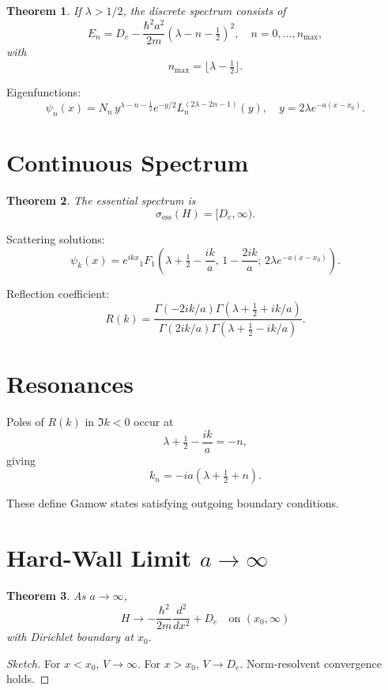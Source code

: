\documentclass[12pt]{article}
\newtheorem{theorem}{Theorem}[section]
\begin{document}
\begin{theorem}
If $\lambda>1/2$, the discrete spectrum consists of
\[
E_n = D_e - \frac{\hbar^2 a^2}{2m}(\lambda-n-\tfrac12)^2,
\quad n=0,\dots,n_{\max},
\]
with
\[
n_{\max}=\lfloor\lambda-\tfrac12\rfloor.
\]
\end{theorem}

Eigenfunctions:
\[
\psi_n(x)
=
N_n\, y^{\lambda-n-\frac12}
e^{-y/2}
L_n^{(2\lambda-2n-1)}(y),
\quad
y=2\lambda e^{-a(x-x_0)}.
\]

\section{Continuous Spectrum}

\begin{theorem}
The essential spectrum is
\[
\sigma_{\text{ess}}(H)=[D_e,\infty).
\]
\end{theorem}

Scattering solutions:
\[
\psi_k(x)
=
e^{ikx}
{}_1F_1\!\left(
\lambda+\tfrac12-\frac{ik}{a},
\,1-\frac{2ik}{a};
\,2\lambda e^{-a(x-x_0)}
\right).
\]

Reflection coefficient:
\[
R(k)=
\frac{\Gamma(-2ik/a)\Gamma(\lambda+\tfrac12+ik/a)}
{\Gamma(2ik/a)\Gamma(\lambda+\tfrac12-ik/a)}.
\]

\section{Resonances}

Poles of $R(k)$ in $\Im k<0$ occur at
\[
\lambda+\tfrac12-\frac{ik}{a}=-n,
\]
giving
\[
k_n=-i a(\lambda+\tfrac12+n).
\]

These define Gamow states satisfying outgoing boundary conditions.

\section{Hard-Wall Limit $a\to\infty$}

\begin{theorem}
As $a\to\infty$,
\[
H\to
-\frac{\hbar^2}{2m}\frac{d^2}{dx^2}+D_e
\quad\text{on }(x_0,\infty)
\]
with Dirichlet boundary at $x_0$.
\end{theorem}

\begin{proof}[Sketch]
For $x<x_0$, $V\to\infty$.
For $x>x_0$, $V\to D_e$.
Norm-resolvent convergence holds.
\end{proof}
\end{document}
